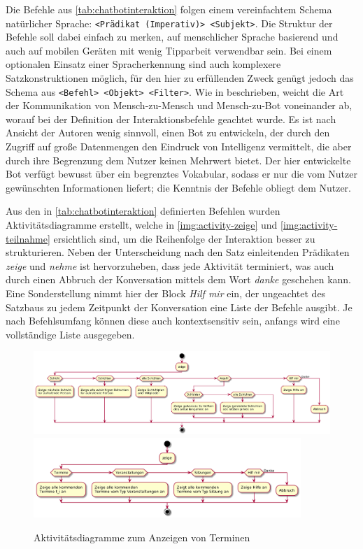 Die Befehle aus \autoref{tab:chatbotinteraktion} folgen einem vereinfachtem Schema natürlicher Sprache: \texttt{<Prädikat (Imperativ)> <Subjekt>}. Die Struktur der Befehle soll dabei einfach zu merken, auf menschlicher Sprache basierend und auch auf mobilen Geräten mit wenig Tipparbeit verwendbar sein. Bei einem optionalen Einsatz einer Spracherkennung sind auch komplexere Satzkonstruktionen möglich, für den hier zu erfüllenden Zweck genügt jedoch das Schema aus \texttt{<Befehl> <Objekt> <Filter>}. Wie in \cite{ZueConversationalinterfacesadvances2000} beschrieben, weicht die Art der Kommunikation von Mensch-zu-Mensch und Mensch-zu-Bot voneinander ab, worauf bei der Definition der Interaktionsbefehle geachtet wurde. Es ist nach Ansicht der Autoren wenig sinnvoll, einen Bot zu entwickeln, der durch den Zugriff auf große Datenmengen den Eindruck von Intelligenz vermittelt, die aber durch ihre Begrenzung dem Nutzer keinen Mehrwert bietet. Der hier entwickelte Bot verfügt bewusst über ein begrenztes Vokabular, sodass er nur die vom Nutzer gewünschten Informationen liefert; die Kenntnis der Befehle obliegt dem Nutzer.

Aus den in \autoref{tab:chatbotinteraktion} definierten Befehlen wurden Aktivitätsdiagramme erstellt, welche in \autoref{img:activity-zeige} und \autoref{img:activity-teilnahme} ersichtlich sind, um die Reihenfolge der Interaktion besser zu strukturieren.
Neben der Unterscheidung nach den Satz einleitenden Prädikaten \textit{zeige} und \textit{nehme} ist hervorzuheben, dass jede Aktivität terminiert, was auch durch einen Abbruch der Konversation mittels dem Wort \textit{danke} geschehen kann. Eine Sonderstellung nimmt hier der Block \textit{Hilf mir} ein, der ungeachtet des Satzbaus zu jedem Zeitpunkt der Konversation eine Liste der Befehle ausgibt. Je nach Befehlsumfang können diese auch kontextsensitiv sein, anfangs wird eine vollständige Liste ausgegeben.

\begin{figure}[htbp]
    \centering
    \includegraphics[width=\textwidth]{../docs/uml/activity-zeige.png}
    \includegraphics[width=0.9\textwidth]{../docs/uml/activity-zeige2.png}
    \caption{Aktivitätsdiagramme zum Anzeigen von Terminen}
    \label{img:activity-zeige}
\end{figure}


